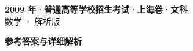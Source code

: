 \documentclass[zihao=-4, a4paper]{ctexart}
\begin{document}
\begin{center}
  {\Large\bfseries 2009 年·普通高等学校招生考试·上海卷·文科}\\[4pt]
  {\large 数学 · 解析版}
\end{center}
\medskip
{}

\clearpage
{}
\begin{center}{\Large\bfseries 参考答案与详细解析}\end{center}
\medskip

\end{document}
